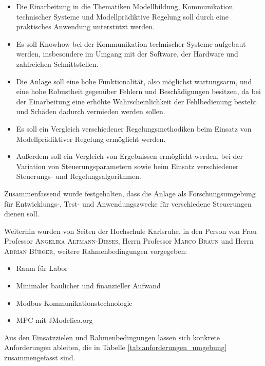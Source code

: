 \begin{itemize}
	\item Die Einarbeitung in die Thematiken Modellbildung, Kommunikation technischer Systeme und Modellprädiktive Regelung soll durch eine praktisches Anwendung unterstützt werden.
	\item Es soll Knowhow bei der Kommunikation technischer Systeme aufgebaut werden, insbesondere im Umgang mit der Software, der Hardware und zahlreichen Schnittstellen.
	\item Die Anlage soll eine hohe Funktionalität, also möglichst wartungsarm, und eine hohe Robustheit gegenüber Fehlern und Beschädigungen besitzen, da bei der Einarbeitung eine erhöhte Wahrscheinlichkeit der Fehlbedienung besteht und Schäden dadurch vermieden werden sollen.
	\item Es soll ein Vergleich verschiedener Regelungsmethodiken beim Einsatz von Modellprädiktiver Regelung ermöglicht werden.
	\item Außerdem soll ein Vergleich von Ergebnissen ermöglicht werden, bei der Variation von Steuerungsparametern sowie beim Einsatz verschiedener Steuerungs- und Regelungsalgorithmen.
\end{itemize}

Zusammenfassend wurde festgehalten, dass die Anlage als Forschungsumgebung für Entwicklungs-, Test- und Anwendungszwecke für verschiedene Steuerungen dienen soll.


Weiterhin wurden von Seiten der Hochschule Karlsruhe, in den Person von Frau Professor \textsc{Angelika Altmann-Dieses}, Herrn Professor \textsc{Marco Braun} und Herrn \textsc{Adrian Bürger}, weitere Rahmenbedingungen vorgegeben:
\begin{itemize}
	\item Raum für Labor
	\item Minimaler baulicher und finanzieller Aufwand
	\item Modbus Kommunikationstechnologie
	\item MPC mit JModelica.org
\end{itemize}


Aus den Einsatzzielen und Rahmenbedingungen lassen sich konkrete Anforderungen ableiten, die in Tabelle \ref{tab:anforderungen_umgebung} zusammengefasst sind.


